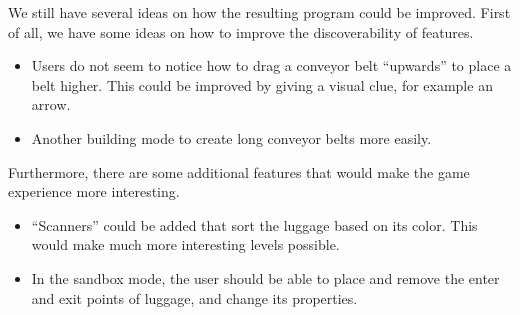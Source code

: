 We still have several ideas on how the resulting program could be improved. First of all, we have some ideas on how to improve the discoverability of features.
\begin{itemize}
 \item Users do not seem to notice how to drag a conveyor belt ``upwards'' to place a belt higher. This could be improved by giving a visual clue, for example an arrow.
 \item Another building mode to create long conveyor belts more easily.
\end{itemize}
Furthermore, there are some additional features that would make the game experience more interesting.
\begin{itemize}
 \item ``Scanners'' could be added that sort the luggage based on its color. This would make much more interesting levels possible.
 \item In the sandbox mode, the user should be able to place and remove the enter and exit points of luggage, and change its properties.
\end{itemize}
